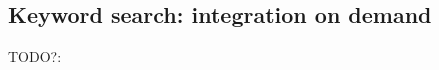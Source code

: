 \subsection{Keyword search: integration on demand}
{\color{red}TODO?: \cite[ch.16]{principles_data_integration}}
















